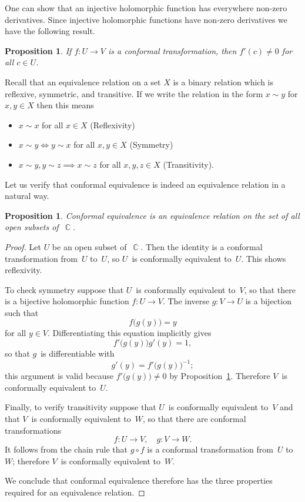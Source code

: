 \documentclass{amsproc}
\newtheorem{proposition}[theorem]{Proposition}
\theoremstyle{definition}
\theoremstyle{remark}
\DeclareMathOperator{\C}{\mathbb{C}}
\numberwithin{equation}{section}
\begin{document}
One can show that an injective holomorphic function has everywhere non-zero derivatives.
Since injective holomorphic functions have non-zero derivatives we have the following result.

\begin{proposition} \label{CMP14.2}
If $ f: U \to  V $ is a conformal transformation, then $ f'(c) \neq 0 $ for all $ c \in U $.
\end{proposition}

Recall that an equivalence relation on a set $ X $ is a binary relation which is reflexive, symmetric, and transitive.
If we write the relation in the form $ x \sim y $ for $ x,y \in X $ then this means

\begin{itemize}
\item $ x \sim x $ for all $ x \in X $ (Reflexivity)
\item $ x \sim y \iff y \sim x $ for all $ x,y \in X $ (Symmetry)
\item $ x \sim y, y \sim z \implies x \sim z $ for all $ x,y,z \in X $ (Transitivity).
\end{itemize}

Let us verify that conformal equivalence is indeed an equivalence relation in a natural way.

\begin{proposition} \label{CMP14.3}
Conformal equivalence is an equivalence relation on the set of all open subsets of~$ \C $.
\end{proposition}

\begin{proof}
Let $ U $ be an open subset of~$ \C $. Then the identity is a conformal transformation from~$ U $ to~$ U $, so $U $~is conformally equivalent to~$ U $. This shows
reflexivity.

To check symmetry suppose that $ U $~is conformally equivalent to~$ V $, so that there is a bijective holomorphic function $ f: U \to V $. The inverse $ g: V \to U $ is a
bijection such that
$$
f\bigl(g(y)\bigr) = y
$$
for all $ y \in V $. Differentiating this equation implicitly gives
$$
f'\bigl(g(y)\bigr)g'(y) = 1,
$$
so that $ g $~is differentiable with
$$
g'(y) = f'\bigl(g(y)\bigr)^{-1};
$$
this argument is valid because $ f'\bigl(g(y)\bigr) \neq 0 $ by Proposition~\ref{CMP14.2}. Therefore $ V $~is conformally equivalent to~$ U $.

Finally, to verify transitivity suppose that $ U $~is conformally equivalent to~$ V $ and that $ V $~is conformally equivalent to~$ W $, so that there are conformal transformations
$$
f: U \to V,\quad g: V \to W.
$$
It follows from the chain rule that $ g \circ f $ is a conformal transformation from~$ U $ to~$ W $; therefore $ V $~is conformally equivalent to~$ W $.

We conclude that conformal equivalence therefore has the three properties required for an equivalence relation.
\end{proof}
\end{document}
